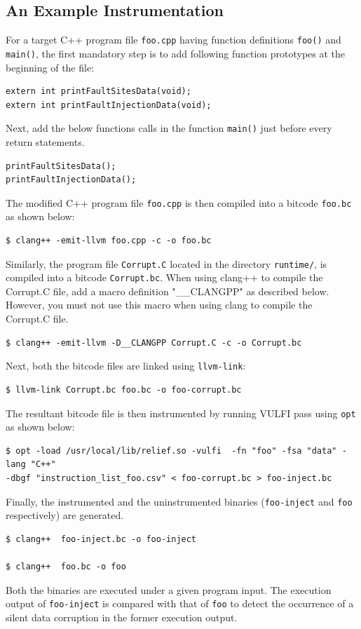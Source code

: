 \documentclass[12pt,a4paper]{article}
\begin{document}
\subsection{An Example Instrumentation}
For a target C++ program file \texttt{foo.cpp}
having function definitions \texttt{foo()}
and \texttt{main()}, the first mandatory step is to 
add following function prototypes at the beginning of the file:
%
%
\begin{Verbatim}[fontsize=\relsize{-1},frame=single,framerule=0.1mm]
extern int printFaultSitesData(void);
extern int printFaultInjectionData(void); 
\end{Verbatim}
%
%
Next, add the below functions calls in the function \texttt{main()}
just before every return statements.
\begin{Verbatim}[fontsize=\relsize{-1},frame=single,framerule=0.1mm]
printFaultSitesData();
printFaultInjectionData(); 
\end{Verbatim}
%
%
%
The modified C++ program file \texttt{foo.cpp} is then
compiled into a bitcode \texttt{foo.bc} as shown below:
%
\begin{Verbatim}[fontsize=\relsize{-1},frame=single,framerule=0.1mm]
 $ clang++ -emit-llvm foo.cpp -c -o foo.bc
 \end{Verbatim}
%
%
Similarly, the program file \texttt{Corrupt.C} located in the
directory \texttt{runtime/}, is compiled into a bitcode \texttt{Corrupt.bc}. 
When using clang++ to compile the Corrupt.C file, add a macro definition
"\_\_CLANGPP" as described below. However, you must not use this macro when
using clang to compile the Corrupt.C file.

%
\begin{Verbatim}[fontsize=\relsize{-1},frame=single,framerule=0.1mm]
$ clang++ -emit-llvm -D__CLANGPP Corrupt.C -c -o Corrupt.bc
\end{Verbatim}
Next, both the bitcode files are linked using \texttt{llvm-link}:
%
\begin{Verbatim}[fontsize=\relsize{-1},frame=single,framerule=0.1mm]
$ llvm-link Corrupt.bc foo.bc -o foo-corrupt.bc
\end{Verbatim}
%
The resultant bitcode file is then instrumented by running VULFI pass 
using \texttt{opt} as shown below:
%
\begin{Verbatim}[fontsize=\relsize{-1},frame=single,framerule=0.1mm]
$ opt -load /usr/local/lib/relief.so -vulfi  -fn "foo" -fsa "data" -lang "C++"
-dbgf "instruction_list_foo.csv" < foo-corrupt.bc > foo-inject.bc
\end{Verbatim}
%
%
Finally, the instrumented and the uninstrumented binaries (\texttt{foo-inject} and \texttt{foo} 
respectively) are generated.
%
%
\begin{Verbatim}[fontsize=\relsize{-1},frame=single,framerule=0.1mm]
$ clang++  foo-inject.bc -o foo-inject

$ clang++  foo.bc -o foo
\end{Verbatim}
%
Both the binaries are executed under a given program input. 
%
The execution output of \texttt{foo-inject} is compared with that of
\texttt{foo} to detect the occurrence of a silent data corruption in
the former execution output.
%
\end{document}
